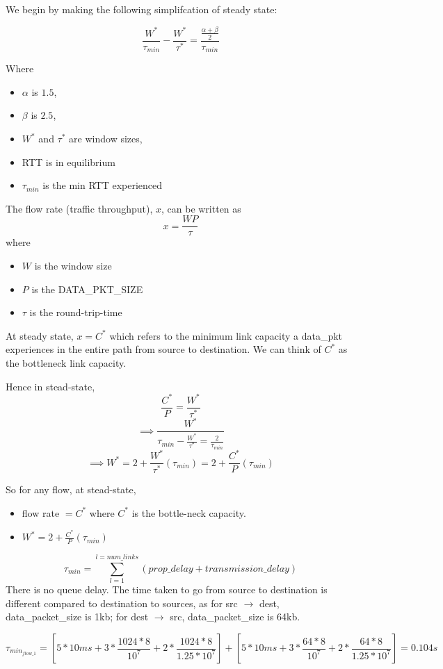 \documentclass[12pt]{article}
\begin{document}
We begin by making the following simplifcation of steady state:

$$ \frac{W^*}{\tau_{min}} - \frac{W^*}{\tau^*} = \frac{\frac{\alpha + \beta}{2}}{\tau_{min}} $$

Where 
\begin{itemize}
\item $\alpha$ is $1.5$,
\item $\beta$ is $2.5$,
\item $W^*$ and $\tau^*$ are window sizes,
\item RTT is in equilibrium
\item $\tau_{min}$ is the min RTT experienced
\end{itemize}

The flow rate (traffic throughput), $x$, can be written as $$x=\frac{WP}{\tau}$$ where
\begin{itemize}
\item $W$ is the window size
\item $P$ is the DATA\_PKT\_SIZE
\item $\tau$ is the round-trip-time
\end{itemize}

At steady state, $x=C^*$ which refers to the minimum link capacity a data\_pkt experiences in the entire path from source to destination. We can think of $C^*$ as the bottleneck link capacity.

Hence in stead-state, $$\frac{C^*}{P} = \frac{W^*}{\tau^*} $$
$$\implies \frac{W^*}{\tau_{min} - \frac{W^*}{\tau^*} = \frac{2}{\tau_{min}}}$$
$$\implies W^* = 2 + \frac{W^*}{\tau^*}(\tau_{min}) = 2 + \frac{C^*}{P}(\tau_{min}) $$

So for any flow, at stead-state, 
\begin{itemize}
\item flow rate $= C^*$ where $C^*$ is the bottle-neck capacity.
\item $W^*=2 + \frac{C^*}{P}(\tau_{min})$
\end{itemize}


$$\tau_{min}=\sum_{l=1}^{l=num\_links} (prop\_delay + transmission\_delay)$$
There is no queue delay. The time taken to go from source to destination is different compared to destination to sources, as for src $\rightarrow$ dest, data\_packet\_size is 1kb; for dest $\rightarrow$ src, data\_packet\_size is 64kb.


$$\tau_{min_{flow\_1}} = [5*10 ms + 3*\frac{1024*8}{10^7} + 2*\frac{1024*8}{1.25*10^7}] + [5*10 ms + 3*\frac{64*8}{10^7} + 2*\frac{64*8}{1.25*10^7}] = 0.104 s$$ 
\end{document}
